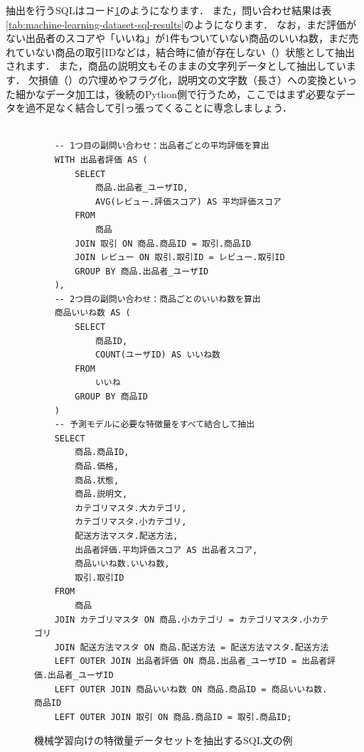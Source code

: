 抽出を行うSQLはコード\ref{code:machine-learning-dataset-sql}のようになります．
また，問い合わせ結果は表\ref{tab:machine-learning-dataset-sql-results}のようになります．
なお，まだ評価がない出品者のスコアや「いいね」が1件もついていない商品のいいね数，まだ売れていない商品の取引IDなどは，結合時に値が存在しない（）状態として抽出されます．
また，商品の説明文もそのままの文字列データとして抽出しています．
欠損値（）の穴埋めやフラグ化，説明文の文字数（長さ）への変換といった細かなデータ加工は，後続のPython側で行うため，ここではまず必要なデータを過不足なく結合して引っ張ってくることに専念しましょう．
\begin{figure}[!htbp]
    \begin{verbatim}

    -- 1つ目の副問い合わせ：出品者ごとの平均評価を算出
    WITH 出品者評価 AS (
        SELECT
            商品.出品者_ユーザID,
            AVG(レビュー.評価スコア) AS 平均評価スコア
        FROM
            商品
        JOIN 取引 ON 商品.商品ID = 取引.商品ID
        JOIN レビュー ON 取引.取引ID = レビュー.取引ID
        GROUP BY 商品.出品者_ユーザID
    ),
    -- 2つ目の副問い合わせ：商品ごとのいいね数を算出
    商品いいね数 AS (
        SELECT
            商品ID,
            COUNT(ユーザID) AS いいね数
        FROM
            いいね
        GROUP BY 商品ID
    )
    -- 予測モデルに必要な特徴量をすべて結合して抽出
    SELECT
        商品.商品ID,
        商品.価格,
        商品.状態,
        商品.説明文,
        カテゴリマスタ.大カテゴリ,
        カテゴリマスタ.小カテゴリ,
        配送方法マスタ.配送方法,
        出品者評価.平均評価スコア AS 出品者スコア,
        商品いいね数.いいね数,
        取引.取引ID
    FROM
        商品
    JOIN カテゴリマスタ ON 商品.小カテゴリ = カテゴリマスタ.小カテゴリ
    JOIN 配送方法マスタ ON 商品.配送方法 = 配送方法マスタ.配送方法
    LEFT OUTER JOIN 出品者評価 ON 商品.出品者_ユーザID = 出品者評価.出品者_ユーザID
    LEFT OUTER JOIN 商品いいね数 ON 商品.商品ID = 商品いいね数.商品ID
    LEFT OUTER JOIN 取引 ON 商品.商品ID = 取引.商品ID;

    \end{verbatim}
    \captionsetup{name=コード}
    \caption{機械学習向けの特徴量データセットを抽出するSQL文の例}
    \label{code:machine-learning-dataset-sql}
\end{figure}

